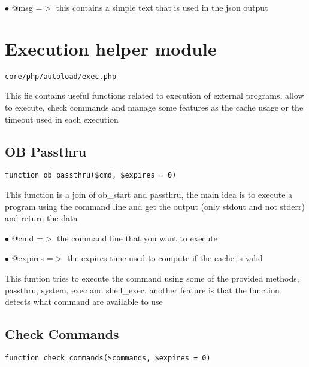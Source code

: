 \documentclass[a4paper]{book}
\begin{document}
\begin{compactitem}
\item[\color{myblue}$\bullet$] @msg =$>$ this contains a simple text that is used in the json output
\end{compactitem}

\hypertarget{toc108}{}
\section{Execution helper module}

\begin{lstlisting}
core/php/autoload/exec.php
\end{lstlisting}

This fie contains useful functions related to execution of external programs, allow to execute,
check commands and manage some features as the cache usage or the timeout used in each execution

\hypertarget{toc109}{}
\subsection{OB Passthru}

\begin{lstlisting}
function ob_passthru($cmd, $expires = 0)
\end{lstlisting}

This function is a join of ob\_start and passthru, the main idea
is to execute a program using the command line and get the
output (only stdout and not stderr) and return the data

\begin{compactitem}
\item[\color{myblue}$\bullet$] @cmd     =$>$ the command line that you want to execute
\item[\color{myblue}$\bullet$] @expires =$>$ the expires time used to compute if the cache is valid
\end{compactitem}

This funtion tries to execute the command using some of the
provided methods, passthru, system, exec and shell\_exec, another
feature is that the function detects what command are available
to use

\hypertarget{toc110}{}
\subsection{Check Commands}

\begin{lstlisting}
function check_commands($commands, $expires = 0)
\end{lstlisting}
\end{document}

